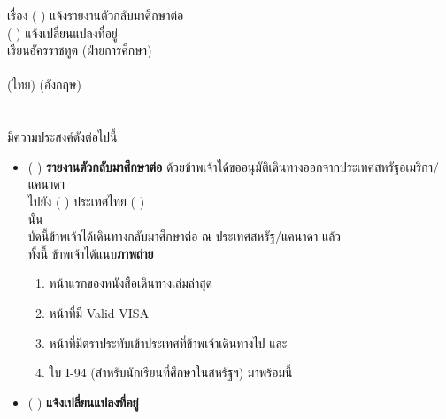 \documentclass[a4paper,13pt]{article}
\begin{document}
\noindent
เรื่อง ( ) แจ้งรายงานตัวกลับมาศึกษาต่อ \\
\phantom{เรื่อง }( ) แจ้งเปลี่ยนแปลงที่อยู่ \\
เรียน\hspace{10pt}อัครราชทูต (ฝ่ายการศึกษา) \\
\indent{}  \\
\indent\hspace{1.6in} (ไทย) \hspace{1.4in} (อังกฤษ) \\
  \\
  \\
มีความประสงค์ดังต่อไปนี้
\begin{itemize}[label={}]
  \item ( ) \textbf{\textbf{รายงานตัวกลับมาศึกษาต่อ}} ด้วยข้าพเจ้าได้ขออนุมัติเดินทางออกจากประเทศสหรัฐอเมริกา/แคนาดา \\
  \indent\hspace{0.6in}ไปยัง ( ) ประเทศไทย ( )  \\
  \indent\hspace{0.6in}  นั้น \\
  \indent\hspace{0.6in}บัดนี้ข้าพเจ้าได้เดินทางกลับมาศึกษาต่อ ณ ประเทศสหรัฐ/แคนาดา แล้ว  \\
  \indent\hspace{0.6in}ทั้งนี้ ข้าพเจ้าได้แนบ\textbf{\underline{ภาพถ่าย}}
  \begin{enumerate}
    \setlength{\itemindent}{0.5in}
    \item หน้าแรกของหนังสือเดินทางเล่มล่าสุด
    \item หน้าที่มี Valid VISA
    \item หน้าที่มีตราประทับเข้าประเทศที่ข้าพเจ้าเดินทางไป และ
    \item ใบ I-94 (สำหรับนักเรียนที่ศึกษาในสหรัฐฯ) มาพร้อมนี้
  \end{enumerate}
  \item ( ) \textbf{\textbf{แจ้งเปลี่ยนแปลงที่อยู่}} \\
  \indent\hspace{0.7in} \\
  \indent\hspace{0.7in}\phantom{ที่อยู่ใหม่} \\

\end{itemize}
\end{document}
